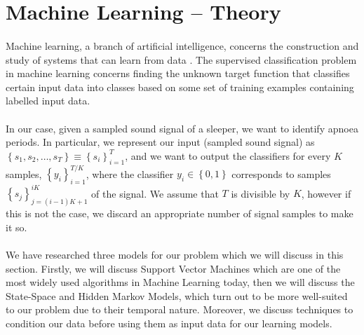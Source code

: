 \section{Machine Learning -- Theory}

\paragraph{}
	Machine learning, a branch of artificial intelligence, concerns the construction and study of systems that can learn from data \cite{wiki:machineLearning}. The supervised classification problem in machine learning concerns finding the unknown target function that classifies certain input data into classes based on some set of training examples containing labelled input data.
	
\paragraph{}
	In our case, given a sampled sound signal of a sleeper, we want to identify apnoea periods. In particular, we represent our input (sampled sound signal) as $\left\{s_1, s_2, \dotsc, s_T \right\} \equiv \left\{ s_i \right\}_{i = 1}^{T}$, and we want to output the classifiers for every $K$ samples, $\left\{ y_i \right\}_{i = 1}^{T/K}$, where the classifier $y_i \in \left\{0, 1\right\}$ corresponds to samples $\left\{ s_j \right\}_{j = \left(i - 1\right)K + 1}^{iK}$ of the signal. We assume that $T$ is divisible by $K$, however if this is not the case, we discard an appropriate number of signal samples to make it so.
	
\paragraph{}
	We have researched three models for our problem which we will discuss in this section. Firstly, we will discuss Support Vector Machines which are one of the most widely used algorithms in Machine Learning today, then we will discuss the State-Space and Hidden Markov Models, which turn out to be more well-suited to our problem due to their temporal nature. Moreover, we discuss techniques to condition our data before using them as input data for our learning models.
	




